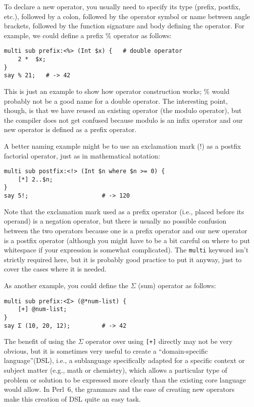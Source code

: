 To declare a new operator, you usually need to specify 
its type (prefix, postfix, etc.), followed by a colon, 
followed by the operator symbol or name between angle brackets, 
followed by the function signature and body defining 
the operator. For example, we could define a prefix \% 
operator as follows:

\begin{verbatim}
multi sub prefix:<%> (Int $x) {   # double operator
    2 *  $x;
}
say % 21;   # -> 42
\end{verbatim}

This is just an example to show how operator construction works; \% would 
probably not be a good name for a double operator. The 
interesting point, though, is that we have reused an existing 
operator (the modulo operator), but the compiler does not 
get confused because modulo is an infix operator and our 
new operator is defined as a prefix operator.

A better naming example might be to use an exclamation 
mark (!) as a postfix factorial operator, just as in 
mathematical notation:

\begin{verbatim}
multi sub postfix:<!> (Int $n where $n >= 0) {
    [*] 2..$n;
}
say 5!;                     # -> 120
\end{verbatim}

Note that the exclamation mark used as a prefix 
operator (i.e., placed before its operand) is 
a negation operator, but there is usually no possible 
confusion between the two operators because one is a 
prefix operator and our new operator is a postfix operator 
(although you might have to be a bit careful on where 
to put whitespace if your expression is somewhat 
complicated). The {\tt multi} keyword isn't strictly 
required here, but it is probably good practice to 
put it anyway, just to cover the cases where it is 
needed. 

As another example, you could define the $\Sigma$ (sum) 
operator as follows:

\begin{verbatim}
multi sub prefix:<Σ> (@*num-list) {
    [+] @num-list;
}
say Σ (10, 20, 12);         # -> 42
\end{verbatim}

The benefit of using the $\Sigma$ operator over using 
\verb'[+]' directly may not be very obvious, but it is 
sometimes very useful to create a ``domain-specific 
language''(DSL), i.e., a sublanguage specifically 
adapted for a specific context or subject matter (e.g., math 
or chemistry), which allows a particular type of problem 
or solution to be expressed more clearly than the 
existing core language would allow. In Perl~6, the 
grammars and the ease of creating new operators make 
this creation of DSL quite an easy task.


